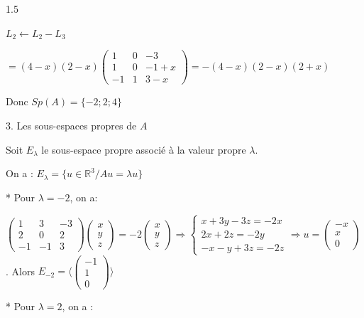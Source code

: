 \documentclass[12pt]{article}
\begin{document}
\begin{spacing}{1.5}
\begin{flushright}
$L_2\longleftarrow L_2-L_3$
\end{flushright}

$=(4-x)(2-x)\begin{pmatrix}
1 & 0 & -3 \\ 
1 & 0 & -1+x \\ 
-1 & 1 & 3-x
\end{pmatrix}=-(4-x)(2-x)(2+x)$

Donc $Sp(A)=\{-2;2;4\}$

3. Les sous-espaces propres de $A$

Soit $E_\lambda$ le sous-espace propre associé à la valeur propre $\lambda$.

On a : $E_\lambda=\{u\in \mathbb{R}^3/Au=\lambda u\}$

* Pour $\lambda=-2$, on a:

$\begin{pmatrix}
1 & 3 & -3 \\ 
2 & 0 & 2 \\ 
-1 & -1 & 3
\end{pmatrix}\begin{pmatrix}
x \\ 
y \\ 
z
\end{pmatrix}=-2\begin{pmatrix}
x \\ 
y \\ 
z
\end{pmatrix}\Rightarrow\begin{cases}
x+3y-3z=-2x\\
2x+2z=-2y\\
-x-y+3z=-2z
\end{cases}\Rightarrow u=\begin{pmatrix}
-x \\ 
x \\ 
0
\end{pmatrix}$. Alors $E_{-2}=\langle \begin{pmatrix}
-1 \\ 
1 \\ 
0
\end{pmatrix}\rangle$

* Pour $\lambda=2$, on a :


\end{spacing}
\end{document}
